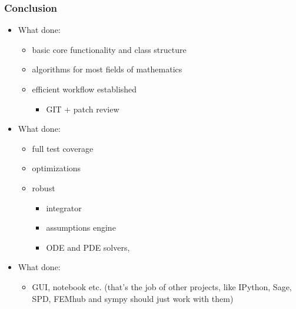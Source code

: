 \documentclass[handout]{beamer}
\begin{document}
\begin{frame}
    \frametitle{Conclusion}

    \begin{itemize}
        \item<1-> What  done:
            \begin{itemize}
                \item basic core functionality and class structure
                \item algorithms for most fields of mathematics
                \item efficient workflow established
                \begin{itemize}
                    \item GIT + patch review
                \end{itemize}
            \end{itemize}
        \item<2-> What  done:
            \begin{itemize}
                \item full test coverage
                \item optimizations
                \item robust
                \begin{itemize}
                    \item integrator
                    \item assumptions engine
                    \item ODE and PDE solvers, \structure{\ldots}
                \end{itemize}
            \end{itemize}
        \item<3-> What  done:
            \begin{itemize}
                \item GUI, notebook etc. (that's the job of other projects,
                like IPython, Sage, SPD, FEMhub and sympy should just work with
                them)
            \end{itemize}
    \end{itemize}
\end{frame}


%
%    
%    
\end{document}
